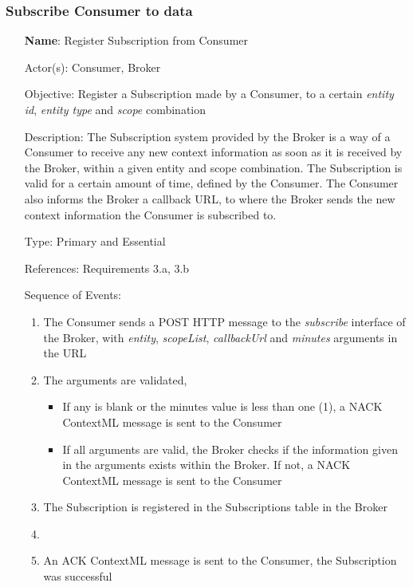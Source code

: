 \subsubsection{Subscribe Consumer to data}
\begin{itemize}
	\item[\textbf{Name}:] Register Subscription from Consumer
	\item[Actor(s):] Consumer, Broker
	\item[Objective:] Register a Subscription made by a Consumer, to a certain \textit{entity id}, \textit{entity type} and \textit{scope} combination
	\item[Description:] The Subscription system provided by the Broker is a way of a Consumer to receive any new context information as soon as it is received by the Broker, within a given entity and scope combination. The Subscription is valid for a certain amount of time, defined by the Consumer. The Consumer also informs the Broker a callback URL, to where the Broker sends the new context information the Consumer is subscribed to.
	\item[Type:] Primary and Essential
	\item[References:] Requirements 3.a, 3.b 
	\item[Sequence of Events:]\hfill
	\begin{enumerate}
		\item The Consumer sends a POST HTTP message to the \textit{subscribe} interface of the Broker, with \textit{entity}, \textit{scopeList}, \textit{callbackUrl} and \textit{minutes} arguments in the URL
		\item The arguments are validated, 
		\begin{itemize}
			\item If any is blank or the minutes value is less than one (1), a NACK ContextML message is sent to the Consumer
			\item If all arguments are valid, the Broker checks if the information given in the arguments exists within the Broker. If not, a NACK ContextML message is sent to the Consumer
		\end{itemize}
		\item The Subscription is registered in the Subscriptions table in the Broker
		\item {}
		\item An ACK ContextML message is sent to the Consumer, the Subscription was successful
	\end{enumerate}
\end{itemize}

